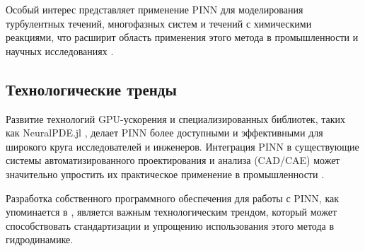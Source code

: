 Особый интерес представляет применение PINN для моделирования турбулентных течений, многофазных систем и течений с химическими
реакциями, что расширит область применения этого метода в промышленности и научных исследованиях \cite{sun2020surrogate}.

\subsection{Технологические тренды}
Развитие технологий GPU-ускорения и специализированных библиотек, таких как NeuralPDE.jl \cite{neuralpde2023}, делает PINN
более доступными и эффективными для широкого круга исследователей и инженеров. Интеграция PINN в существующие системы
автоматизированного проектирования и анализа (CAD/CAE) может значительно упростить их практическое применение в
промышленности \cite{cuomo2022scientific}.

Разработка собственного программного обеспечения для работы с PINN, как упоминается в \cite{lu2021deepxde}, является важным
технологическим трендом, который может способствовать стандартизации и упрощению использования этого метода в гидродинамике.





